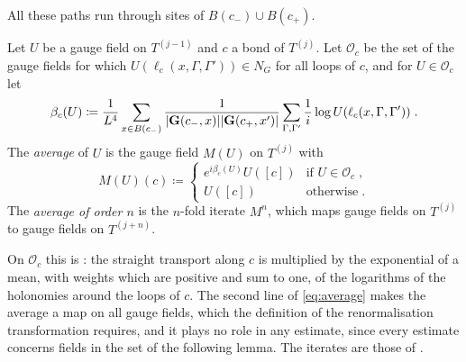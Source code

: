 \documentclass[11pt]{preprint}
\DeclarePairedDelimiter{\abs}{\lvert}{\rvert}
\numberwithin{equation}{section}
\begin{document}
All these paths run through sites of $B(c_-) \cup B(c_+)$.

\begin{definition}\label{def:average}
Let $U$ be a gauge field on $T^{(j-1)}$ and $c$ a bond of $T^{(j)}$. Let $\mathcal O_c$ be the set of the gauge fields for which $U(\ell_c(x, \Gamma, \Gamma')) \in N_G$ for all loops of $c$, and for $U \in \mathcal O_c$ let
\begin{equation}\label{eq:average-exponent}
    \beta_c(U) \coloneqq \frac{1}{L^4}\sum_{x \in B(c_-)}\frac{1}{\abs{\mathbf G(c_-, x)}\abs{\mathbf G(c_+, x')}}\sum_{\Gamma, \Gamma'}\frac{1}{i}\log U(\ell_c(x, \Gamma, \Gamma'))\;.
\end{equation}
The \emph{average} of $U$ is the gauge field $M(U)$ on $T^{(j)}$ with
\begin{equation}\label{eq:average}
    M(U)(c) \coloneqq
    \begin{cases}
        e^{i\beta_c(U)}U([c]) & \text{if } U \in \mathcal O_c\;,\\
        U([c]) & \text{otherwise}\;.
    \end{cases}
\end{equation}
The \emph{average of order $n$} is the $n$-fold iterate $M^n$, which maps gauge fields on $T^{(j)}$ to gauge fields on $T^{(j+n)}$.
\end{definition}

On $\mathcal O_c$ this is \cite[(0.4), p.~253]{BalabanRG1}: the straight transport along $c$ is multiplied by the exponential of a mean, with weights which are positive and sum to one, of the logarithms of the holonomies around the loops of $c$. The second line of \eqref{eq:average} makes the average a map on all gauge fields, which the definition of the renormalisation transformation requires, and it plays no role in any estimate, since every estimate concerns fields in the set of the following lemma. The iterates are those of \cite[(43), p.~24]{BalabanAVG}.
\end{document}
